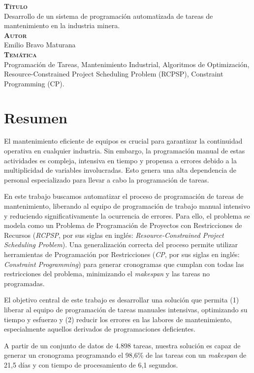 \documentclass{article}
\begin{document}
{\bfseries\scshape Título}\\[.25cm]
Desarrollo de un sistema de programación automatizada de tareas de mantenimiento en la industria minera.\\


{\bfseries\scshape Autor}\\[.25cm]
Emilio Bravo Maturana\\

{\bfseries\scshape Temática}\\[.25cm]
Programación de Tareas, Mantenimiento Industrial, Algoritmos de Optimización, Resource-Constrained Project Scheduling Problem (RCPSP), Constraint Programming (CP).

\newpage

\section*{Resumen}
El mantenimiento eficiente de equipos es crucial para garantizar la continuidad operativa en cualquier industria. Sin embargo, la programación manual de estas actividades es compleja, intensiva en tiempo y propensa a errores debido a la multiplicidad de variables involucradas. Esto genera una alta dependencia de personal especializado para llevar a cabo la programación de tareas.

En este trabajo buscamos automatizar el proceso de programación de tareas de mantenimiento, liberando al equipo de programación de trabajo manual intensivo y reduciendo significativamente la ocurrencia de errores. Para ello, el problema se modela como un Problema de Programación de Proyectos con Restricciones de Recursos (\textit{RCPSP}, por sus siglas en inglés: \textit{Resource-Constrained Project Scheduling Problem}). Una generalización correcta del proceso permite utilizar herramientas de Programación por Restricciones (\textit{CP}, por sus siglas en inglés: \textit{Constraint Programming}) para generar cronogramas que cumplan con todas las restricciones del problema, minimizando el \textit{makespan} y las tareas no programadas.

El objetivo central de este trabajo es desarrollar una solución que permita (1) liberar al equipo de programación de tareas manuales intensivas, optimizando su tiempo y esfuerzo y (2) reducir los errores en las labores de mantenimiento, especialmente aquellos derivados de programaciones deficientes.

A partir de un conjunto de datos de 4.898 tareas, nuestra solución es capaz de generar un cronograma programando el 98,6\% de las tareas con un \textit{makespan} de 21,5 días y con tiempo de procesamiento de 6,1 segundos.
\newpage
\end{document}
